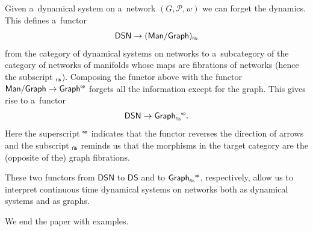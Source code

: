 \documentclass[pdftex]{sigma}
\numberwithin{equation}{section}
\newcommand{\op}[1]{{#1}^{\mbox{\sf{\tiny{op}}}}}
\newcommand{\gf}[1]{{#1}_{\mbox{\sf{\tiny{f\/ib}}}}}
\newcommand{\opfib}[1]{{{#1}_{\mbox{\sf{\tiny{f\/ib}}}}}^{\mbox{\sf{\tiny{op}}}}}
\begin{document}
\begin{Remark}
Given a~dynamical system on a~network $(G,{\mathcal P},w)$ we can forget the dynamics.
This def\/ines a~functor
\begin{gather*}
\mathsf{DSN} \to (\mathsf{Man}/\mathsf{Graph})_{\mbox{\sf{\tiny{f\/ib}}}}
\end{gather*}
from the category of dynamical systems on networks to a~subcategory of the category of networks of manifolds whose maps
are f\/ibrations of networks (hence the subscript $_{\mbox{\sf{\tiny{f\/ib}}}}$).
Composing the functor above with the functor $\mathsf{Man}/\mathsf{Graph} \to \op{\mathsf{Graph}}$ forgets all the
information except for the graph.
This gives rise to a~functor
\begin{gather*}
\mathsf{DSN}\to \opfib{\mathsf{Graph}}.
\end{gather*}
Here the superscript $\op{}$ indicates that the functor reverses the direction of arrows and the subscript $\gf{}$
reminds us that the morphisms in the target category are the (opposite of the) graph f\/ibrations.

These two functors from $\mathsf{DSN}$ to $\mathsf{DS}$ and to $\opfib{\mathsf{Graph}}$, respectively, allow us to
interpret continuous time dynamical systems on networks both as dynamical systems and as graphs.
\end{Remark}
We end the paper with examples.
\end{document}
